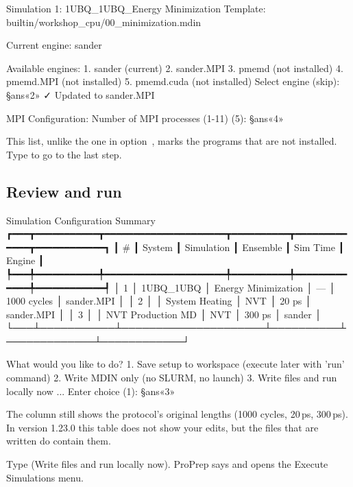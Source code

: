 \begin{screen}
Simulation 1: 1UBQ_1UBQ_Energy Minimization
Template: builtin/workshop_cpu/00_minimization.mdin

Current engine: sander

Available engines:
  1. sander (current)
  2. sander.MPI
  3. pmemd (not installed)
  4. pmemd.MPI (not installed)
  5. pmemd.cuda (not installed)
Select engine (skip): §ans«2»
✓ Updated to sander.MPI

MPI Configuration:
Number of MPI processes (1-11) (5): §ans«4»
\end{screen}

This list, unlike the one in option~, marks the programs that are not
installed. Type  to go to the last step.

\subsection{Review and run}

\begin{screen}
                      Simulation Configuration Summary
┏━━━┳━━━━━━━━━━━┳━━━━━━━━━━━━━━━━━━━━━┳━━━━━━━━━━┳━━━━━━━━━━━━━┳━━━━━━━━━━━━┓
┃ # ┃ System    ┃ Simulation          ┃ Ensemble ┃ Sim Time    ┃ Engine     ┃
┡━━━╇━━━━━━━━━━━╇━━━━━━━━━━━━━━━━━━━━━╇━━━━━━━━━━╇━━━━━━━━━━━━━╇━━━━━━━━━━━━┩
│ 1 │ 1UBQ_1UBQ │ Energy Minimization │ —        │ 1000 cycles │ sander.MPI │
│ 2 │           │ System Heating      │ NVT      │ 20 ps       │ sander.MPI │
│ 3 │           │ NVT Production MD   │ NVT      │ 300 ps      │ sander     │
└───┴───────────┴─────────────────────┴──────────┴─────────────┴────────────┘

What would you like to do?
   1. Save setup to workspace (execute later with 'run' command)
   2. Write MDIN only (no SLURM, no launch)
   3. Write files and run locally now
...
Enter choice (1): §ans«3»
\end{screen}

\begin{watchout}
The  column still shows the protocol's original lengths
(1000 cycles, 20\,ps, 300\,ps). In version 1.23.0 this table does not show
your edits, but the files that are written do contain them.
\end{watchout}

\begin{steps}
  \item Type  (Write files and run locally now). ProPrep says
         and opens
        the Execute Simulations menu.
\end{steps}

